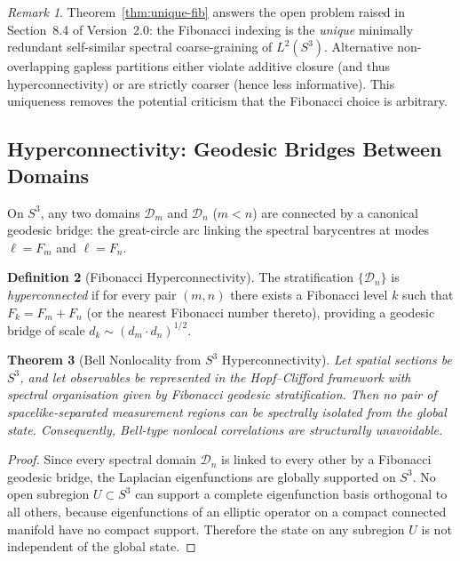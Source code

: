 \documentclass[12pt,a4paper]{article}
\newtheorem{theorem}{Theorem}[section]
\theoremstyle{definition}
\newtheorem{definition}[theorem]{Definition}
\theoremstyle{remark}
\newtheorem{remark}[theorem]{Remark}
\begin{document}
\begin{remark}
Theorem~\ref{thm:unique-fib} answers the open problem raised in Section~8.4 of
Version~2.0: the Fibonacci indexing is the \emph{unique} minimally redundant
self-similar spectral coarse-graining of $L^2(S^3)$. Alternative non-overlapping
gapless partitions either violate additive closure (and thus hyperconnectivity)
or are strictly coarser (hence less informative). This uniqueness removes the
potential criticism that the Fibonacci choice is arbitrary.
\end{remark}

\subsection{Hyperconnectivity: Geodesic Bridges Between Domains}

On $S^3$, any two domains $\mathcal{D}_m$ and $\mathcal{D}_n$ ($m<n$) are connected
by a canonical geodesic bridge: the great-circle arc linking the spectral barycentres
at modes $\ell = F_m$ and $\ell = F_n$.

\begin{definition}[Fibonacci Hyperconnectivity]
The stratification $\{\mathcal{D}_n\}$ is \emph{hyperconnected} if for every pair
$(m,n)$ there exists a Fibonacci level $k$ such that $F_k = F_m+F_n$ (or the
nearest Fibonacci number thereto), providing a geodesic bridge of scale
$d_k \sim (d_m\cdot d_n)^{1/2}$.
\end{definition}

\begin{theorem}[Bell Nonlocality from $S^3$ Hyperconnectivity]
Let spatial sections be $S^3$, and let observables be represented in the
Hopf--Clifford framework with spectral organisation given by Fibonacci geodesic
stratification. Then no pair of spacelike-separated measurement regions can be
spectrally isolated from the global state. Consequently, Bell-type nonlocal
correlations are structurally unavoidable.
\end{theorem}

\begin{proof}
Since every spectral domain $\mathcal{D}_n$ is linked to every other by a Fibonacci
geodesic bridge, the Laplacian eigenfunctions are globally supported on $S^3$. No
open subregion $U\subset S^3$ can support a complete eigenfunction basis orthogonal
to all others, because eigenfunctions of an elliptic operator on a compact connected
manifold have no compact support. Therefore the state on any subregion $U$ is not
independent of the global state.
\end{proof}
\end{document}
